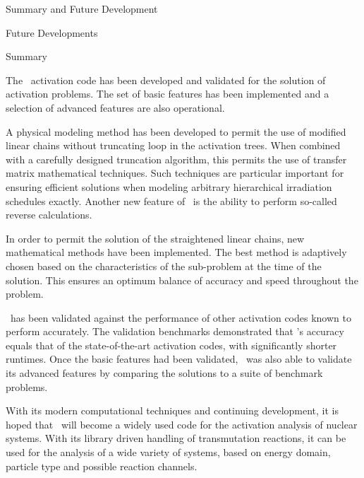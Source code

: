 \begin{chapter}{Summary and Future Development}
\begin{section}{Future Developments}
  \end{section}
  
  \begin{section}{Summary}
    
    The \ALARA\ activation code has been developed and validated for
    the solution of activation problems.  The set of basic features
    has been implemented and a selection of advanced features are also
    operational.  
    
    A physical modeling method has been developed to permit the use of
    modified linear chains without truncating loop in the activation
    trees.  When combined with a carefully designed truncation
    algorithm, this permits the use of transfer matrix mathematical
    techniques.  Such techniques are particular important for ensuring
    efficient solutions when modeling arbitrary hierarchical
    irradiation schedules exactly.  Another new feature of \ALARA\ is
    the ability to perform so-called reverse calculations.
    
    In order to permit the solution of the straightened linear chains,
    new mathematical methods have been implemented.  The best method
    is adaptively chosen based on the characteristics of the
    sub-problem at the time of the solution.  This ensures an optimum
    balance of accuracy and speed throughout the problem.
    
    \ALARA\ has been validated against the performance of other
    activation codes known to perform accurately.  The validation
    benchmarks demonstrated that \ALARA's accuracy equals that of the
    state-of-the-art activation codes, with significantly shorter
    runtimes.  Once the basic features had been validated, \ALARA\ was
    also able to validate its advanced features by comparing the
    solutions to a suite of benchmark problems.
    
    With its modern computational techniques and continuing
    development, it is hoped that \ALARA\ will become a widely used
    code for the activation analysis of nuclear systems.  With its
    library driven handling of transmutation reactions, it can be used
    for the analysis of a wide variety of systems, based on energy
    domain, particle type and possible reaction channels.

  \end{section}

\end{chapter}